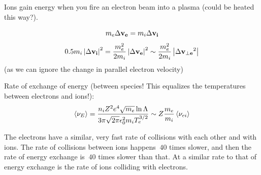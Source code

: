 Ions gain energy when you fire an electron beam into a plasma (could be heated this way?).

\[ m_e \Delta \mathbf{v_e} = m_i \Delta \mathbf{v_i}\]
\[ 0.5 m_i \left| \Delta \mathbf{v_i} \right|^2 = \frac{ m_e^2}{2 m_i} \left| \Delta \mathbf{v_e} \right|^2 \sim \frac{m_e^2}{2 m_i} \left| \Delta \mathbf{v_{\perp e}}^2 \right|\]
(as we can ignore the change in parallel electron velocity)

Rate of exchange of energy (between species! This equalizes the temperatures between electrons and ions!):
\[ \left< \nu_E \right> = \frac{n_i Z^2 e^4 \sqrt{m_e} \ln{\Lambda}}{3 \pi \sqrt{2 \pi} \epsilon_0^2 m_i T_e^{3/2}} \sim Z \frac {m_e}{m_i} \left< \nu_{ei} \right> \]

The electrons have a similar, very fast rate of collisions with each other and with ions. The rate of collisions between ions happens $~40$ times slower, and then the rate of energy exchange is $~40$ times slower than that. At a similar rate to that of energy exchange is the rate of ions colliding with electrons.

